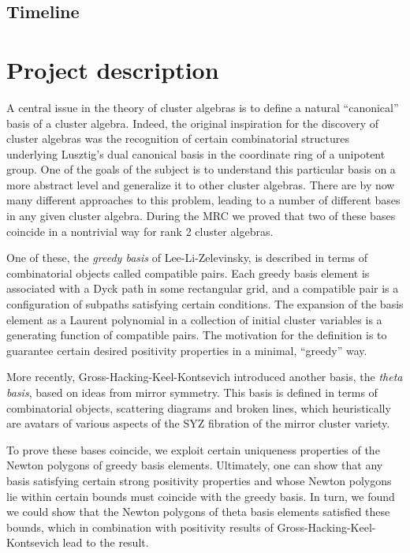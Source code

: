\documentclass{amsart}
\begin{document}
  \subsection*{Timeline}

  \section*{Project description}

    A central issue in the theory of cluster algebras is to define a natural
    ``canonical'' basis of a cluster algebra.  Indeed, the original inspiration
    for the discovery of cluster algebras was the recognition of certain
    combinatorial structures underlying Lusztig's dual canonical basis in the
    coordinate ring of a unipotent group.  One of the goals of the subject
    is to understand this particular basis on a more abstract level and
    generalize it to other cluster algebras.  There are by now many
    different approaches to this problem, leading to a number of
    different bases in any given cluster algebra.  During the MRC we proved that two of these bases coincide in a nontrivial way 
    for rank 2 cluster algebras.  

    One of these, the \emph{greedy basis} of Lee-Li-Zelevinsky, is
    described in terms of combinatorial objects called compatible pairs.
    Each greedy basis element is associated with a Dyck path in some rectangular
    grid, and a compatible pair is a configuration of subpaths satisfying
    certain conditions.  The expansion of the basis element as a Laurent polynomial in a collection of initial
    cluster variables is a generating function of compatible pairs.  The
    motivation for the definition is to guarantee certain desired positivity
    properties in a minimal, ``greedy'' way.

    More recently, Gross-Hacking-Keel-Kontsevich introduced another basis, the
    \emph{theta basis}, based on ideas from mirror symmetry.  This
    basis is defined in terms of combinatorial objects, scattering diagrams and
    broken lines, which heuristically are avatars of various
    aspects of the SYZ fibration of the mirror cluster variety.  
    
    To prove these bases coincide, we exploit certain uniqueness properties of the Newton
    polygons of greedy basis elements.  Ultimately, one can show that any basis
    satisfying certain strong positivity properties and whose Newton polygons
    lie within certain bounds must coincide with the greedy basis.  In turn, we
    found we could show that the Newton polygons of theta basis elements
    satisfied these bounds, which in combination with positivity results of
    Gross-Hacking-Keel-Kontsevich lead to the result. 
    
\end{document}
